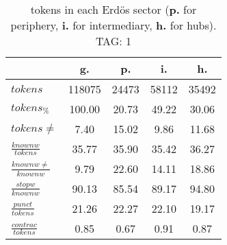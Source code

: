 \begin{table}[h!]
\begin{center}
\begin{tabular}{| l | c | c | c | c |}\hline
 & g. & p. & i. & h. \\\hline
$tokens$ & 118075  & 24473  & 58112  & 35492 \\\hline
$tokens_{\%}$ & 100.00  & 20.73  & 49.22  & 30.06 \\\hline
$tokens \neq$ & 7.40  & 15.02  & 9.86  & 11.68 \\\hline
$\frac{knownw}{tokens}$ & 35.77  & 35.90  & 35.42  & 36.27 \\\hline
$\frac{knownw \neq}{knownw}$ & 9.79  & 22.60  & 14.11  & 18.86 \\\hline
$\frac{stopw}{knownw}$ & 90.13  & 85.54  & 89.17  & 94.80 \\\hline
$\frac{punct}{tokens}$ & 21.26  & 22.27  & 22.10  & 19.17 \\\hline
$\frac{contrac}{tokens}$ & 0.85  & 0.67  & 0.91  & 0.87 \\\hline
\end{tabular}
\caption{tokens in each Erd\"os sector ({{\bf p.}} for periphery, {{\bf i.}} for intermediary, 
    {{\bf h.}} for hubs). TAG: 1}
\end{center}
\end{table}